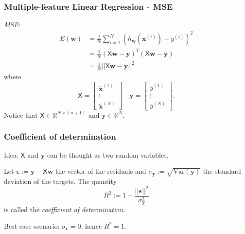 \documentclass{beamer}
\begin{document}
	\begin{frame}
		\frametitle{Multiple-feature Linear Regression - MSE}
		\textsl{MSE}:
		\begin{align*}
			E(\bm{w}) &= \frac{1}{N} \sum_{i=1}^{N} (h_{\bm{w}}(\bm{x}^{(i)}) - y^{(i)})^2\\
			&= \frac{1}{N} (\mathsf{X} \bm{w} - \bm{y})^T (\mathsf{X}\bm{w} - \bm{y})\\
			&= \frac{1}{N} ||\mathsf{X}\bm{w} - \bm{y}||^2
		\end{align*}
		where
		\begin{equation*}
			\mathsf{X} = \begin{bmatrix}
				\tilde{\bm{x}}^{(1)}\\
				\vdots\\
				\tilde{\bm{x}}^{(N)}
			\end{bmatrix} \quad \bm{y} = \begin{bmatrix}
			y^{(1)} \\
			\vdots\\
			y^{(N)}
		\end{bmatrix}.
		\end{equation*}
	Notice that $\mathsf{X} \in \mathbb{R}^{N \times (n+1)}$ and $\bm{y} \in \mathbb{R}^N$.
	\end{frame}

	\begin{frame}
		\frametitle{Coefficient of determination}
		Idea: $\mathsf{X}$ and $\bm{y}$ can be thought as two random variables.
		
		\vspace{5mm}
		
		Let $\bm{\epsilon} := \bm{y} - \mathsf{X}\bm{w}$ the vector of the residuals and $\sigma_{\bm{y}}:= \sqrt{\text{Var}(\bm{y})}$ the standard deviation of the targets.  The quantity
		\begin{equation*}
			R^2 := 1 - \frac{||\bm{\epsilon}||^2}{\sigma_{\bm{y}}^2}
		\end{equation*}
		is called the \textsl{coefficient of determination}.
		
		\vspace{5mm}
		
		Best case scenario: $\sigma_{\bm{\epsilon}} = 0$, hence $R^2 = 1$.
		
	\end{frame}
\end{document}
